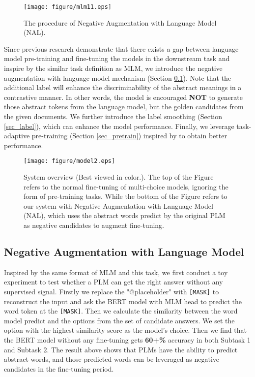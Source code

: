 \documentclass[11pt,a4paper]{article}
\begin{document}
\begin{figure}[ht]
    \centering
    \texttt{[image: figure/mlm11.eps]}
    \caption{The procedure of Negative Augmentation with Language Model (NAL).}
    \label{fig:NAL}
\end{figure}

Since previous research  \cite{DBLP:journals/corr/abs-2012-15723,xlnet} demonstrate that there exists a gap between language model pre-training and fine-tuning the models in the downstream task and inspire by the similar task definition as MLM, we introduce the negative augmentation with language model mechanism (Section \ref{sect:approach-gap}). Note that the additional label will enhance the discriminability of the abstract meanings in a contrastive manner. In other words, the model is encouraged \textbf{NOT} to generate those abstract tokens from the language model, but the golden candidates from the given documents.  We further introduce the label smoothing (Section \ref{sec_label}), which can enhance the model performance. Finally, we leverage task-adaptive pre-training (Section \ref{sec_pretrain}) inspired by \cite{noauthor_200410964_nodate} to obtain better performance. 

\begin{figure*}

\centering
\texttt{[image: figure/model2.eps]}
\caption{\label{font-figue} System overview (Best viewed in color.). The top of the Figure refers to the normal fine-tuning of multi-choice models, ignoring the form of pre-training tasks. 
While the bottom of the Figure refers to our system with Negative Augmentation with Language Model (NAL), which uses the abstract words predict by the original PLM as negative candidates to augment fine-tuning.}
\label{fig: model}
\end{figure*}

\subsection{Negative Augmentation with Language Model}
\label{sect:approach-gap}

Inspired by the same format of MLM and this task, we first conduct a toy experiment to test whether a PLM can get the right answer without any supervised signal.
Firstly we replace the "@placeholder" with \texttt{[MASK]} to reconstruct the input and ask the BERT model with MLM head to predict the word token at the \texttt{[MASK]}.
Then we calculate the similarity between the word model predict and the options from the set of candidate answers.
We set the option with the highest similarity score as the model's choice.
Then we find that the BERT model without any fine-tuning gets \textbf{60+\%} accuracy in both Subtask 1 and Subtask 2.
The result above shows that PLMs have the ability to predict abstract words, and those predicted words can be leveraged as negative candidates in the fine-tuning period.
\end{document}

